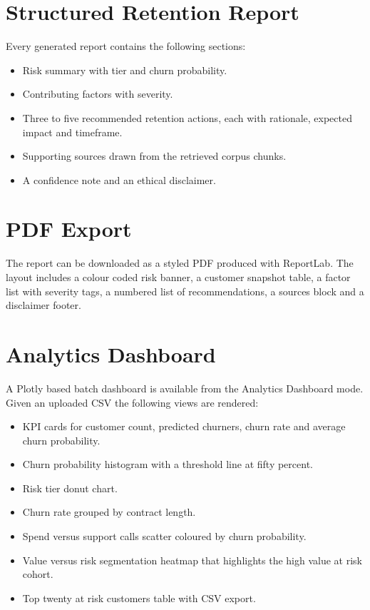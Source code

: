 \documentclass[conference]{IEEEtran}
\begin{document}
\section{Structured Retention Report}
Every generated report contains the following sections:
\begin{itemize}
    \item Risk summary with tier and churn probability.
    \item Contributing factors with severity.
    \item Three to five recommended retention actions, each with rationale, expected impact and timeframe.
    \item Supporting sources drawn from the retrieved corpus chunks.
    \item A confidence note and an ethical disclaimer.
\end{itemize}

\section{PDF Export}
The report can be downloaded as a styled PDF produced with ReportLab. The layout includes a colour coded risk banner, a customer snapshot table, a factor list with severity tags, a numbered list of recommendations, a sources block and a disclaimer footer.

\section{Analytics Dashboard}
A Plotly based batch dashboard is available from the Analytics Dashboard mode. Given an uploaded CSV the following views are rendered:
\begin{itemize}
    \item KPI cards for customer count, predicted churners, churn rate and average churn probability.
    \item Churn probability histogram with a threshold line at fifty percent.
    \item Risk tier donut chart.
    \item Churn rate grouped by contract length.
    \item Spend versus support calls scatter coloured by churn probability.
    \item Value versus risk segmentation heatmap that highlights the high value at risk cohort.
    \item Top twenty at risk customers table with CSV export.
\end{itemize}
\end{document}
